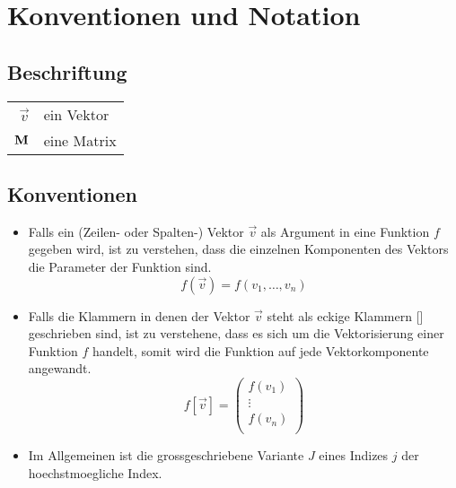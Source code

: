 \documentclass[../main]{subfiles}
\begin{document}
\section{Konventionen und Notation}

\subsection*{Beschriftung}

\begin{tabular}{rl}
  $\vec{v}$ & ein Vektor \\
  $\mathbf{M}$ & eine Matrix \\

\end{tabular}


\subsection*{Konventionen}

\begin{itemize}

\item{
    Falls ein (Zeilen- oder Spalten-) Vektor $\vec{v}$ als Argument in eine Funktion $f$ gegeben wird, ist zu verstehen,
    dass die einzelnen Komponenten des Vektors die Parameter der Funktion sind.
    \begin{equation*}
      f(\vec{v})=f(v_1,\ldots,v_n)
    \end{equation*}
  }

\item{
    Falls die Klammern in denen der Vektor $\vec{v}$ steht als eckige
    Klammern [] geschrieben sind, ist zu verstehene, dass es sich um die
    Vektorisierung einer Funktion $f$ handelt, somit wird die Funktion auf
    jede Vektorkomponente angewandt.
    \begin{equation*}
      f[\vec{v}]=
      \begin{pmatrix}
        f(v_1)\\
        \vdots \\
        f(v_n)\\
      \end{pmatrix}
    \end{equation*}
  }

\item{
    Im Allgemeinen ist die grossgeschriebene Variante $J$ eines Indizes
    $j$ der hoechstmoegliche Index.
  }


\end{itemize}
\end{document}
